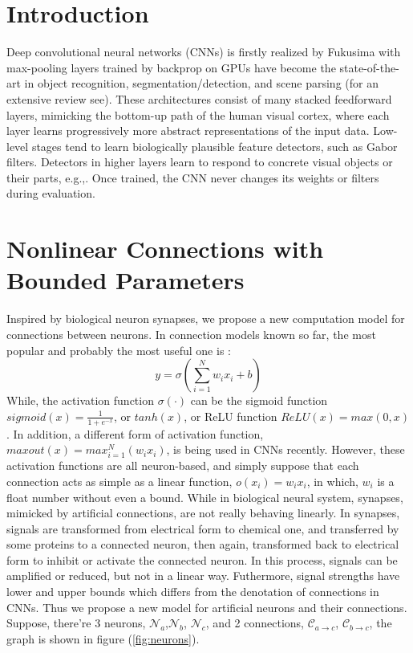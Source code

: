 \documentclass[conference]{IEEEtran}
\begin{document}
\section{Introduction}
Deep convolutional neural networks (CNNs) is firstly realized by Fukusima \cite{fukushima1979neural} with
max-pooling layers\cite{weng1992cresceptron} trained by
backprop\cite{lecun1989backpropagation} on GPUs\cite{ciresan2011flexible}
have become the state-of-the-art in object recognition\cite{ciregan2012multi,
krizhevsky2012imagenet,goodfellow2013maxout,lin2013network},
segmentation/detection\cite{cirecsan2013mitosis,ciresan2012deep}, and scene
parsing\cite{farabet2013learning,sermanet2013pedestrian}
(for an extensive review see\cite{schmidhuber2015deep}). These architectures
consist of many stacked feedforward layers, mimicking the bottom-up path of
the human visual cortex, where each layer learns progressively more abstract
representations of the input data. Low-level stages tend to learn biologically
plausible feature detectors, such as Gabor filters\cite{gabor1946theory}.
Detectors in higher layers learn to respond to concrete visual objects or
their parts, e.g.,\cite{zeiler2014visualizing}. Once trained, the CNN never
changes its weights or filters during evaluation.

\section{Nonlinear Connections with Bounded Parameters}
Inspired by biological neuron synapses\cite{hall1905textbook,
bayliss1908reciprocal,gerard1941interaction}, we propose a new computation
model for connections between neurons. In connection models known so far,
the most popular and probably the most useful one \cite{jain1996artificial} is :
$$ y=\sigma\left(\sum_{i=1}^{N}w_ix_i+b\right) $$
While, the activation function $\sigma(\cdot)$ can be the sigmoid function
$sigmoid(x)=\frac{1}{1+e^{-x}}$, or $tanh(x)$,
or ReLU function $ReLU(x)=max(0,x)$\cite{nair2010rectified}.
In addition,
a different form of activation function, $maxout(x)=max_{i=1}^N(w_ix_i)$,
is being used in CNNs recently\cite{goodfellow2013maxout}.
However, these activation functions are all neuron-based, and simply suppose
that each connection acts as simple as a linear function, $o(x_i)=w_ix_i$,
in which, $w_i$ is a float number without even a bound. While in biological
neural system, synapses, mimicked by artificial connections, are not really
behaving linearly. In synapses, signals are transformed from electrical form
to chemical one, and transferred by some proteins to a connected neuron,
then again, transformed back to electrical form to inhibit or activate
the connected neuron\cite{gray1959axo,harvey2007locally}. In this process,
signals can be amplified or reduced, but not in a linear way. Futhermore,
signal strengths have lower and upper bounds which differs from the denotation
of connections in CNNs. Thus we propose a new model for artificial neurons and
their connections. Suppose, there're 3 neurons, $\mathcal{N}_a$,$\mathcal{N}_b$,
$\mathcal{N}_c$, and 2 connections, $\mathcal{C}_{a\rightarrow c}$,
$\mathcal{C}_{b\rightarrow c}$, the graph is shown in figure
(\ref{fig:neurons}).
\end{document}
